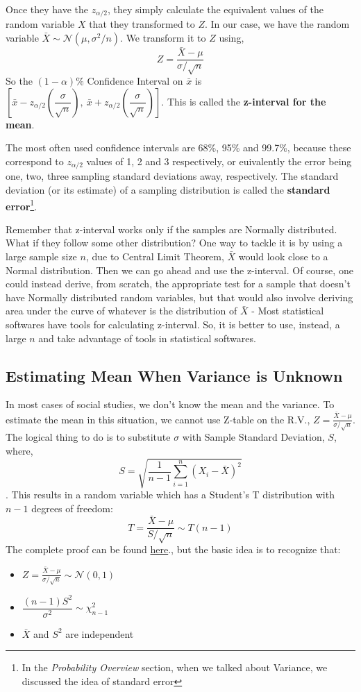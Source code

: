 Once they have the \( z_{\alpha/2} \), they simply calculate the equivalent values of the random variable $X$ that they transformed to $Z$. In our case, we have the random variable \( \bar{X} \sim \mathcal{N}(\mu,\sigma^2/n) \). We transform it to $Z$ using,
 	\[  Z = \frac{\bar{X}-\mu}{\sigma/\sqrt{n}} \]
 So the \( (1-\alpha)\% \) Confidence Interval on $\bar{x}$ is \( [ \bar{x} - z_{\alpha/2}\left(\dfrac{\sigma}{\sqrt{n}}\right),\ \bar{x} + z_{\alpha/2}\left(\dfrac{\sigma}{\sqrt{n}}\right) ] \). This is called the \textbf{z-interval for the mean}.
 
The most often used confidence intervals are 68\%, 95\% and 99.7\%, because these correspond to $z_{\alpha/2}$ values of 1, 2 and 3 respectively, or euivalently the error being one, two, three sampling standard deviations away, respectively. The standard deviation (or its estimate) of a sampling distribution is called the \textbf{standard error}\footnote{In the \emph{Probability Overview} section, when we talked about Variance, we discussed the idea of standard error}. 

Remember that z-interval works only if the samples are Normally distributed. What if they follow some other distribution? One way to tackle it is by using a large sample size $n$, due to Central Limit Theorem, $\bar{X}$ would look close to a Normal distribution. Then we can go ahead and use the z-interval. Of course, one could instead derive, from scratch, the appropriate test for a sample that doesn't have Normally distributed random variables, but that would also involve deriving area under the curve of whatever is the distribution of $\bar{X}$ - Most statistical softwares have tools for calculating z-interval. So, it is better to use, instead, a large $n$ and take advantage of tools in statistical softwares.
 
 
\subsection {Estimating Mean When Variance is Unknown}
 In most cases of social studies, we don't know the mean and the variance. To estimate the mean in this situation, we cannot use Z-table on the R.V., \(  Z = \frac{\bar{X}-\mu}{\sigma/\sqrt{n}} \). The logical thing to do is to substitute $\sigma$ with Sample Standard Deviation, $S$, where,
 	\[ S=\sqrt{\dfrac{1}{n-1}\sum\limits_{i=1}^n (X_i-\bar{X})^2} \].
This results in a random variable which has a Student's T distribution with $n-1$ degrees of freedom:
	\[ T=\dfrac{\bar{X}-\mu}{S/\sqrt{n}} \sim T(n-1) \]
The complete proof can be found \href{https://online.stat.psu.edu/stat414/node/199/}{here}., but the basic idea is to recognize that:
	\begin{itemize}
	\item \(  Z = \frac{\bar{X}-\mu}{\sigma/\sqrt{n}} \sim \mathcal{N}(0,1) \)
	\item \( \dfrac{(n-1)S^2}{\sigma^2}\sim \chi^2_{n-1} \)
	\item \(\bar{X}\) and \(S^2\) are independent
	\end{itemize}

